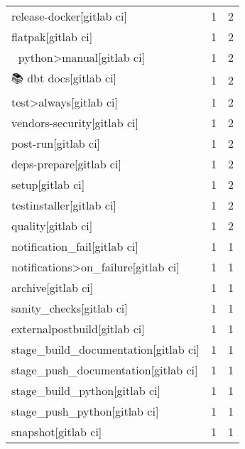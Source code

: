 \begin{tabular}{lrr}
release-docker[gitlab ci]                  &                   1 &             2 \\
flatpak[gitlab ci]                         &                   1 &             2 \\
🐍 python>manual[gitlab ci]                 &                   1 &             2 \\
📚 dbt docs[gitlab ci]                      &                   1 &             2 \\
test>always[gitlab ci]                     &                   1 &             2 \\
vendors-security[gitlab ci]                &                   1 &             2 \\
post-run[gitlab ci]                        &                   1 &             2 \\
deps-prepare[gitlab ci]                    &                   1 &             2 \\
setup[gitlab ci]                           &                   1 &             2 \\
testinstaller[gitlab ci]                   &                   1 &             2 \\
quality[gitlab ci]                         &                   1 &             2 \\
notification\_fail[gitlab ci]               &                   1 &             1 \\
notifications>on\_failure[gitlab ci]        &                   1 &             1 \\
archive[gitlab ci]                         &                   1 &             1 \\
sanity\_checks[gitlab ci]                   &                   1 &             1 \\
externalpostbuild[gitlab ci]               &                   1 &             1 \\
stage\_build\_documentation[gitlab ci]       &                   1 &             1 \\
stage\_push\_documentation[gitlab ci]        &                   1 &             1 \\
stage\_build\_python[gitlab ci]              &                   1 &             1 \\
stage\_push\_python[gitlab ci]               &                   1 &             1 \\
snapshot[gitlab ci]                        &                   1 &             1 \\

\end{tabular}
